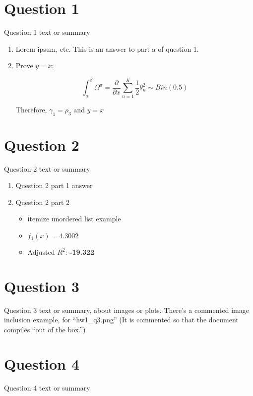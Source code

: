 \documentclass[12pt,letterpaper]{article}
\begin{document}
\section*{Question 1}

Question 1 text or summary

\begin{enumerate}[label=\alph*.]  %
  \item
    Lorem ipsum, etc. This is an answer to part a of question 1.
   
  \item
    Prove $y = x$:
    
    \[
     \int_\alpha^\beta \Omega^\pi =  \frac{\partial}{\partial x}\sum_{n=1}^K \frac 1 2 \theta_n^2 \sim Bin(0.5)
    \]
    
    Therefore, $\gamma_1 = \rho_3$ and $y = x$

\end{enumerate}

\newpage

\section*{Question 2}

Question 2 text or summary

\begin{enumerate}
 \item Question 2 part 1 answer
 
 \item
   Question 2 part 2
   \begin{itemize}
    \item itemize unordered list example
    \item $f_1(x) = \mathbf{4.3002}$
    \item Adjusted $R^2$: \textbf{-19.322}
   \end{itemize}

\end{enumerate}

\section*{Question 3}

Question 3 text or summary, about images or plots. There's a commented image inclusion example, for ``hw1\_q3.png'' (It is commented so that the document compiles ``out of the box.'')

\begin{center}
\end{center}
 
 
\section*{Question 4}

Question 4 text or summary
\end{document}
